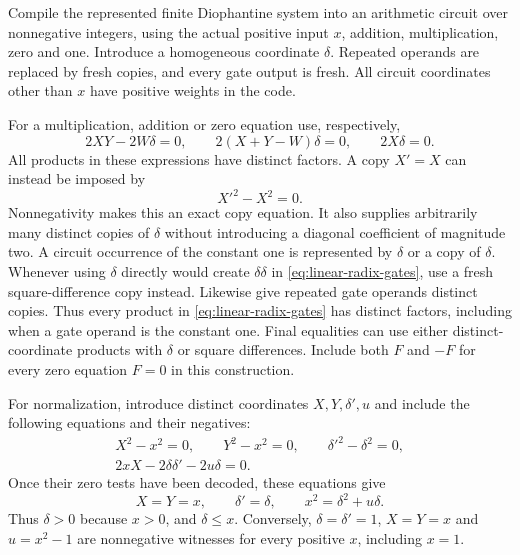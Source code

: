 Compile the represented finite Diophantine system into an
arithmetic circuit over nonnegative integers, using the actual
positive input $x$, addition, multiplication, zero and one.
Introduce a homogeneous coordinate $\delta$. Repeated operands
are replaced by fresh copies, and every gate output is fresh.
All circuit coordinates other than $x$ have positive weights in
the code.

For a multiplication, addition or zero equation use, respectively,
\begin{equation}\label{eq:linear-radix-gates}
 2XY-2W\delta=0,\qquad
 2(X+Y-W)\delta=0,\qquad
 2X\delta=0.
\end{equation}
All products in these expressions have distinct factors. A copy
$X'=X$ can instead be imposed by
\begin{equation}\label{eq:linear-radix-copy}
 X'^2-X^2=0.
\end{equation}
Nonnegativity makes this an exact copy equation. It also supplies
arbitrarily many distinct copies of $\delta$ without introducing
a diagonal coefficient of magnitude two. A circuit occurrence of
the constant one is represented by $\delta$ or a copy of $\delta$.
Whenever using $\delta$ directly would create $\delta\delta$ in
\eqref{eq:linear-radix-gates}, use a fresh square-difference copy
instead. Likewise give repeated gate operands distinct copies.
Thus every product in \eqref{eq:linear-radix-gates} has distinct
factors, including when a gate operand is the constant one. Final
equalities can use either distinct-coordinate products with
$\delta$ or square differences. Include both $F$ and $-F$ for
every zero equation $F=0$ in this construction.

For normalization, introduce distinct coordinates
$X,Y,\delta',u$ and include the following equations and their
negatives:
\begin{equation}\label{eq:linear-radix-normalization}
 \begin{gathered}
 X^2-x^2=0,\qquad Y^2-x^2=0,\qquad
 \delta'^2-\delta^2=0,\\
 2xX-2\delta\delta'-2u\delta=0.
 \end{gathered}
\end{equation}
Once their zero tests have been decoded, these equations give
\begin{equation}\label{eq:linear-radix-guard}
 X=Y=x,\qquad \delta'=\delta,\qquad
 x^2=\delta^2+u\delta.
\end{equation}
Thus $\delta>0$ because $x>0$, and $\delta\le x$.
Conversely, $\delta=\delta'=1$, $X=Y=x$ and $u=x^2-1$ are
nonnegative witnesses for every positive $x$, including $x=1$.

